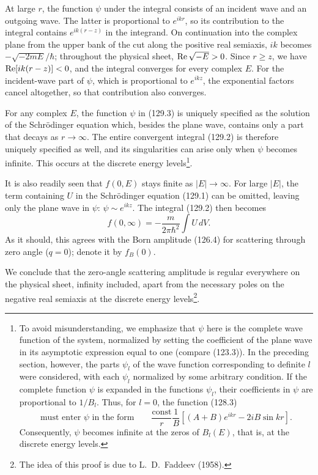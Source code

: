 At large $r$, the function $\psi$ under the integral consists of an incident
wave and an outgoing wave. The latter is proportional to $e^{ikr}$, so its
contribution to the integral contains $e^{ik(r-z)}$ in the integrand. On
continuation into the complex plane from the upper bank of the cut along the
positive real semiaxis, $ik$ becomes $-\sqrt{-2mE}/\hbar$; throughout the
physical sheet, $\mathop{\rm Re}\sqrt{-E}>0$. Since $r\geqslant z$, we have
$\mathop{\rm Re}[ik(r-z)]<0$, and the integral converges for every complex
$E$. For the incident-wave part of $\psi$, which is proportional to
$e^{ikz}$, the exponential factors cancel altogether, so that contribution
also converges.

For any complex $E$, the function $\psi$ in (129.3) is uniquely specified as
the solution of the Schrödinger equation which, besides the plane wave,
contains only a part that decays as $r\to\infty$. The entire convergent
integral (129.2) is therefore uniquely specified as well, and its singularities
can arise only when $\psi$ becomes infinite. This occurs at the discrete
energy levels\footnote{To avoid misunderstanding, we emphasize that $\psi$
here is the complete wave function of the system, normalized by setting the
coefficient of the plane wave in its asymptotic expression equal to one
(compare (123.3)). In the preceding section, however, the parts $\psi_l$ of
the wave function corresponding to definite $l$ were considered, with each
$\psi_l$ normalized by some arbitrary condition. If the complete function
$\psi$ is expanded in the functions $\psi_l$, their coefficients in $\psi$
are proportional to $1/B_l$. Thus, for $l=0$, the function (128.3)
\[
 \text{must enter }\psi\text{ in the form}\qquad
 \frac{\mathrm{const}}r\frac1B[(A+B)e^{ikr}-2iB\sin kr].
\]
Consequently, $\psi$ becomes infinite at the zeros of $B_l(E)$, that is, at
the discrete energy levels.}.

It is also readily seen that $f(0,E)$ stays finite as $|E|\to\infty$. For
large $|E|$, the term containing $U$ in the Schrödinger equation (129.1) can
be omitted, leaving only the plane wave in $\psi$: $\psi\sim e^{ikz}$. The
integral (129.2) then becomes
\[
 f(0,\infty)=-\frac{m}{2\pi\hbar^2}\int U\,dV.
\]
As it should, this agrees with the Born amplitude (126.4) for scattering
through zero angle ($q=0$); denote it by $f_B(0)$.

We conclude that the zero-angle scattering amplitude is regular everywhere
on the physical sheet, infinity included, apart from the necessary poles on
the negative real semiaxis at the discrete energy levels\footnote{The idea of
this proof is due to L.~D.~Faddeev (1958).}.

